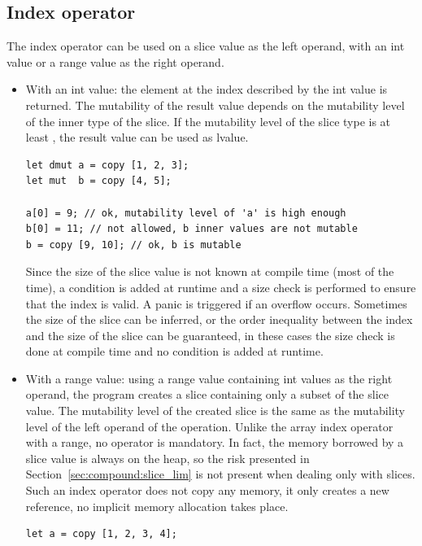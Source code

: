\subsection{Index operator}

The index operator can be used on a slice value as the left operand, with an int
value or a range value as the right operand.

\begin{itemize}
  \setlength\itemsep{-4pt}
\item With an int value: the element at the index described by the int value is
  returned. The mutability of the result value depends on the mutability level
  of the inner type of the slice. If the mutability level of the slice type is
  at least , the result value can be used as lvalue.

  \begin{lstlisting}[style=coloredverbatimError]
let dmut a = copy [1, 2, 3];
let mut  b = copy [4, 5];

a[0] = 9; // ok, mutability level of 'a' is high enough
b[0] = 11; // not allowed, b inner values are not mutable
b = copy [9, 10]; // ok, b is mutable
  \end{lstlisting}

  Since the size of the slice value is not known at compile time (most of the
  time), a condition is added at runtime and a size check is performed to ensure
  that the index is valid. A panic is triggered if an overflow occurs. Sometimes
  the size of the slice can be inferred, or the order inequality between the
  index and the size of the slice can be guaranteed, in these cases the size
  check is done at compile time and no condition is added at runtime.

\item With a range value: using a range value containing int values as the right
  operand, the program creates a slice containing only a subset of the slice
  value. The mutability level of the created slice is the same as the mutability
  level of the left operand of the operation. Unlike the array index operator
  with a range, no  operator is mandatory. In fact, the memory
  borrowed by a slice value is always on the heap, so the risk presented in
  Section~\ref{sec:compound:slice_lim} is not present when dealing only with slices. Such
  an index operator does not copy any memory, it only creates a new reference,
  no implicit memory allocation takes place.

  \begin{lstlisting}[style=coloredverbatim]
let a = copy [1, 2, 3, 4];


\end{lstlisting}
\end{itemize}
